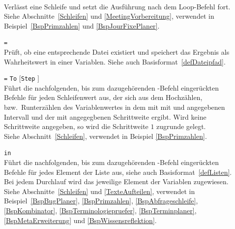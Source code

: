 \begin{description}
\item[]\mbox{}\\
Verlässt eine Schleife und setzt die Ausführung nach dem Loop-Befehl fort.\\
Siehe Abschnitte~\ref{Schleifen} und \ref{MeetingVorbereitung}, verwendet in Beispiel~\ref{BspPrimzahlen} und \ref{BspJourFixePlaner}.

\item[]  \verb|=| \\
Prüft, ob eine entsprechende Datei existiert und speichert das Ergebnis als Wahrheitswert in einer Variablen. Siehe auch Basisformat~\ref{defDateipfad}.

\item[]  \verb|=|  \verb|To|  $[$\verb|Step| $]$\\
Führt die nachfolgenden, bis zum dazugehörenden -Befehl eingerückten Befehle für jeden Schleifenwert aus, der sich aus dem Hochzählen, bzw.\ Runterzählen des Variablenwertes in dem mit mit  und  angegebenen Intervall und der mit  angegegbenen Schrittweite ergibt. Wird keine Schrittweite angegeben, so wird die Schrittweite $1$ zugrunde gelegt.\\
Siehe Abschnitt~\ref{Schleifen}, verwendet in Beispiel \ref{BspPrimzahlen}.

\item[]  \verb|in| \\
Führt die nachfolgenden, bis zum dazugehörenden -Befehl eingerückten Befehle für jedes Element der Liste aus, siehe auch Basisformat~\ref{defListen}. Bei jedem Durchlauf wird das jeweilige Element der Variablen zugewiesen.\\ 
Siehe Abschnitte~\ref{Schleifen} und \ref{TexteAufteilen}, verwendet in Beispiel~\ref{BspBugPlaner}, \ref{BspPrimzahlen}, \ref{BspAbfrageschleife}, \ref{BspKombinator}, \ref{BspTerminologiepruefer}, \ref{BspTerminplaner}, \ref{BspMetaErweiterung} und \ref{BspWissensreflektion}.


\end{description}

